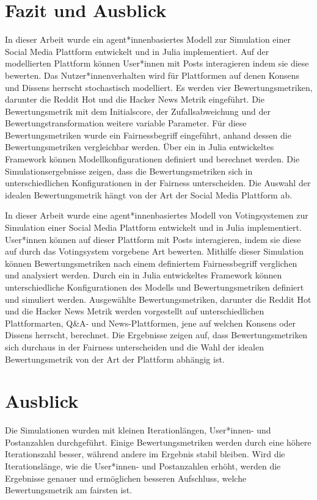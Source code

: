 \chapter{Fazit und Ausblick}

In dieser Arbeit wurde ein agent*innenbasiertes Modell zur Simulation einer Social Media Plattform entwickelt und in Julia implementiert. Auf der modellierten Plattform können User*innen mit Posts interagieren indem sie diese bewerten. Das Nutzer*innenverhalten wird für Plattformen auf denen Konsens und Dissens herrscht stochastisch modelliert. Es werden vier Bewertungsmetriken, darunter die Reddit Hot und die Hacker News Metrik eingeführt. Die Bewertungsmetrik mit dem Initialscore, der Zufallsabweichung und der Bewertungstransformation weitere variable Parameter. Für diese Bewertungsmetriken wurde ein Fairnessbegriff eingeführt, anhand dessen die Bewertungsmetriken vergleichbar werden. Über ein in Julia entwickeltes Framework können Modellkonfigurationen definiert und berechnet werden. Die Simulationsergebnisse zeigen, dass die Bewertungsmetriken sich in unterschiedlichen Konfigurationen in der Fairness unterscheiden. Die Auswahl der idealen Bewertungsmetrik hängt von der Art der Social Media Plattform ab.


In dieser Arbeit wurde eine agent*innenbasiertes Modell von Votingsystemen zur Simulation einer Social Media Plattform entwickelt und in Julia implementiert. User*innen können auf dieser Plattform mit Posts interagieren, indem sie diese auf durch das Votingsystem vorgebene Art bewerten. Mithilfe dieser Simulation können Bewertungsmetriken nach einem definiertem Fairnessbegriff verglichen und analysiert werden. Durch ein in Julia entwickeltes Framework können unterschiedliche Konfigurationen des Modells und Bewertungsmetriken definiert und simuliert werden. Ausgewählte Bewertungsmetriken, darunter die Reddit Hot und die Hacker News Metrik werden vorgestellt auf unterschiedlichen Plattformarten, Q\&A- und News-Plattformen, jene auf welchen Konsens oder Dissens herrscht, berechnet. Die Ergebnisse zeigen auf, dass Bewertungsmetriken sich durchaus in der Fairness unterscheiden und die Wahl der idealen Bewertungsmetrik von der Art der Plattform abhängig ist.


\chapter*{Ausblick}

Die Simulationen wurden mit kleinen Iterationlängen, User*innen- und Postanzahlen durchgeführt. Einige Bewertungsmetriken werden durch eine höhere Iterationszahl besser, während andere im Ergebnis stabil bleiben. Wird die Iterationslänge, wie die User*innen- und Postanzahlen erhöht, werden die Ergebnisse genauer und ermöglichen besseren Aufschluss, welche Bewertungsmetrik am fairsten ist.

